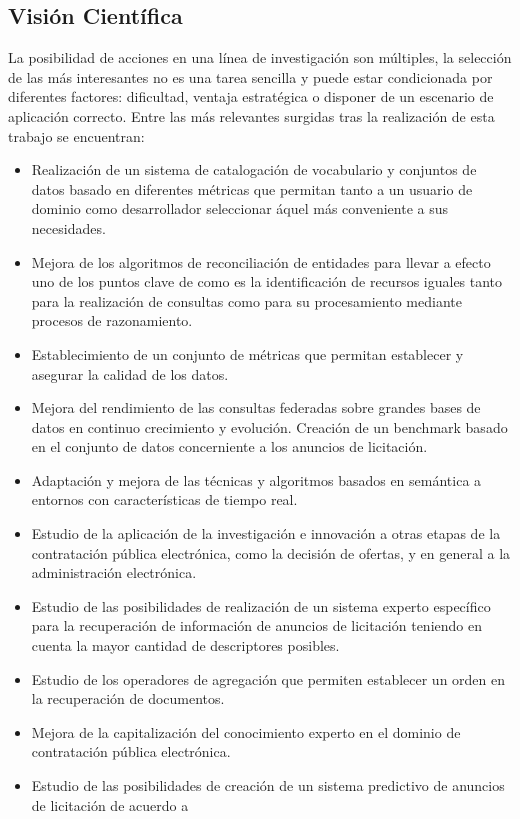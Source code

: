 \subsection{Visión Científica}
La posibilidad de acciones en una línea de investigación son múltiples, la selección de las más interesantes no es una tarea sencilla y puede estar
condicionada por diferentes factores: dificultad, ventaja estratégica o disponer de un escenario de aplicación correcto. Entre las más relevantes 
surgidas tras la realización de esta trabajo se encuentran:

\begin{itemize}
 \item Realización de un sistema de catalogación de vocabulario y conjuntos de datos basado en diferentes métricas que permitan 
tanto a un usuario de dominio como desarrollador seleccionar áquel más conveniente a sus necesidades.
 \item Mejora de los algoritmos de reconciliación de entidades para llevar a efecto uno de los puntos clave de \linkeddata como es 
la identificación de recursos iguales tanto para la realización de consultas como para su procesamiento mediante procesos 
de razonamiento.
 \item Establecimiento de un conjunto de métricas que permitan establecer y asegurar la calidad de los datos.
 \item Mejora del rendimiento de las consultas federadas sobre grandes bases de datos en continuo crecimiento y evolución. Creación 
de un benchmark basado en el conjunto de datos concerniente a los anuncios de licitación.
 \item Adaptación y mejora de las técnicas y algoritmos basados en semántica a entornos con características de tiempo real.
 \item Estudio de la aplicación de la investigación e innovación a otras etapas de la contratación pública electrónica, como la 
decisión de ofertas, y en general a la administración electrónica.
 \item Estudio de las posibilidades de realización de un sistema experto específico para la recuperación de información 
de anuncios de licitación teniendo en cuenta la mayor cantidad de descriptores posibles.
 \item Estudio de los operadores de agregación que permiten establecer un orden en la recuperación de documentos.
 \item Mejora de la capitalización del conocimiento experto en el dominio de contratación pública electrónica.
 \item Estudio de las posibilidades de creación de un sistema predictivo de anuncios de licitación de acuerdo a 

\end{itemize}
